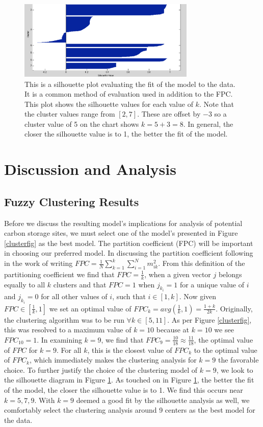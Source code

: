 \documentclass[letterpaper, 12pt]{article}
\begin{document}
\begin{figure}[H]%
   \centering
   \caption{\label{k_means_sil} This is a silhouette plot evaluating the fit of the model to the data. It is a common method of evaluation used in addition to the FPC. This plot shows the silhouette values for each value of $k$. Note that the cluster values range from $[2,7]$. These are offset by $-3$ so a cluster value of 5 on the chart shows $k = 5 + 3 = 8$. In general, the closer the silhouette value is to 1, the better the fit of the model. }
  \includegraphics[width=0.75\textwidth]{k_means_sil}
\end{figure}

\section{Discussion and Analysis}\label{danda}
\subsection{Fuzzy Clustering Results}\label{fcmr}
Before we discuss the resulting model's implications for analysis of potential carbon storage sites, we must select one of the model's presented in Figure \ref{clusterfig} as the best model. 
The partition coefficient (FPC) will be important in choosing our preferred model. In discussing the partition coefficient following in the work of \cite{dunnbar} writing $FPC = \frac{1}{N}\sum_{k = 1}^k \sum_{i = 1}^N m_{ik}^2$. From this definition of the partitioning coefficient we find that $FPC = \frac{1}{k}$, when a given vector $j$ belongs equally to all $k$ clusters and that $FPC = 1$ when $j_{k_i} = 1$ for a unique value of $i$ and $j_{k_i} = 0$ for all other values of $i$, such that $i \in [1, k]$. Now given $FPC \in [\frac{1}{k}, 1]$ we set an optimal value of $FPC_k = avg(\frac{1}{k}, 1) =  \frac{1+k}{2k}$. 
Originally, the clustering algorithm was to be run $\forall k \in [5,11]$. As per Figure \ref{clusterfig}, this was resolved to a maximum value of $k = 10$ because at $k = 10$ we see $FPC_{10} = 1$. In examining $k = 9$, we find that $FPC_9 = \frac{10}{18} \approx \frac{11}{18}$, the optimal value of $FPC$ for $k = 9$. For all $k$, this is the closest value of $FPC_k$ to the optimal value of $FPC_k$, which immediately makes the clustering analysis for $k = 9$ the favorable choice. To further justify the choice of the clustering model of $k = 9$, we look to the silhouette diagram in Figure \ref{k_means_sil}. As touched on in Figure \ref{k_means_sil}, the better the fit of the model, the closer the silhouette value is to 1. We find this occurs near $k = 5, 7, 9$. With $k = 9$ deemed a good fit by the silhouette analysis as well, we comfortably select the clustering analysis around 9 centers as the best model for the data. 
\end{document}
